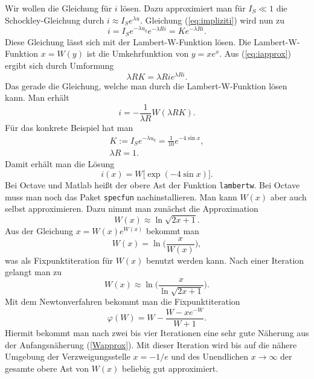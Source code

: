 \documentclass[a4paper,10pt,fleqn,twocolumn,twoside]{article}
\numberwithin{equation}{section}
\begin{document}
Wir wollen die Gleichung für $i$ lösen. Dazu approximiert man für
$I_S\ll 1$ die Schockley-Gleichung durch $i\approx I_S e^{\lambda u}$.
Gleichung (\ref{eq:impliziti}) wird nun zu
\begin{equation}\label{eq:iapprox}
i=I_Se^{-\lambda u_q}e^{-\lambda Ri} = Ke^{-\lambda Ri}.
\end{equation}
Diese Gleichung lässt sich mit der Lambert-W-Funktion lösen.
Die Lambert-W-Funktion $x=W(y)$ ist die Umkehrfunktion von
$y=xe^x$. Aus (\ref{eq:iapprox}) ergibt sich durch Umformung
\begin{equation}
\lambda RK = \lambda Rie^{\lambda Ri}.
\end{equation}
Das gerade die Gleichung, welche man durch die Lambert-W-Funktion
lösen kann. Man erhält
\begin{equation}
i = -\frac{1}{\lambda R}W(\lambda RK).
\end{equation}
Für das konkrete Beispiel hat man
\begin{gather*}
K:=I_S e^{-\lambda u_q} = \frac{1}{10}e^{-4\sin x},\\
\lambda R = 1.
\end{gather*}
Damit erhält man die Lösung
\begin{equation}
i(x) = W[\exp(-4\sin x)\big].
\end{equation}
Bei Octave und Matlab heißt der obere Ast der Funktion
\texttt{lambertw}. Bei Octave muss man noch das Paket
\texttt{specfun} nachinstallieren. Man kann $W(x)$ aber auch
selbst approximieren. Dazu nimmt man zunächst die Approximation
\begin{equation}\label{Wapprox}
W(x)\approx \ln\sqrt{2x+1}.
\end{equation}
Aus der Gleichung $x=W(x)e^{W(x)}$ bekommt man
\begin{equation}
W(x) = \ln\Big(\frac{x}{W(x)}\Big),
\end{equation}
was als Fixpunktiteration für $W(x)$ benutzt werden kann.
Nach einer Iteration gelangt man zu
\begin{equation}
W(x)\approx \ln\bigg(\frac{x}{\ln\sqrt{2x+1}}\bigg).
\end{equation}
Mit dem Newtonverfahren bekommt man die Fixpunktiteration
\begin{equation}
\varphi(W) = W-\frac{W-xe^{-W}}{W+1}.
\end{equation}
Hiermit bekommt man nach zwei bis vier Iterationen eine sehr gute
Näherung aus der Anfangsnäherung (\ref{Wapprox}). Mit dieser
Iteration wird bis auf die nähere Umgebung der Verzweigungsstelle
$x=-1/e$ und des Unendlichen $x\rightarrow\infty$ der gesamte
obere Ast von $W(x)$ beliebig gut approximiert.
\end{document}
